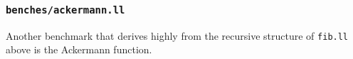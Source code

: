\documentclass{article}
\begin{document}
\subsubsection{\lstinline!benches/ackermann.ll!}

Another benchmark that derives highly from the recursive structure of \lstinline!fib.ll! above is the Ackermann function.



\end{document}
